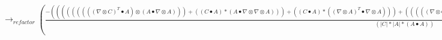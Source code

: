 \documentclass{article}
\begin{document}
\newline $\rightarrow_{refactor}( \frac{-{((((((((( \nabla  \otimes C)^T \bullet A) \otimes (A \bullet  \nabla  \otimes A)))+((C \bullet A)*(A \bullet  \nabla  \otimes  \nabla  \otimes A)))+((C \bullet A)*(( \nabla  \otimes A)^T \bullet  \nabla  \otimes A)))+((((( \nabla  \otimes C)^T \bullet A)*(A \bullet  \nabla  \otimes A))))^T)+((((C \bullet  \nabla  \otimes A)*(A \bullet  \nabla  \otimes A))))^T)+(((C \bullet  \nabla  \otimes A) \otimes (A \bullet  \nabla  \otimes A))))}}{(|C|*|A|*(A \bullet A))}+ \frac{((C \bullet A)*((C \bullet  \nabla  \otimes C) \otimes (C \bullet  \nabla  \otimes C)))}{(|C|*|A|*((C \bullet C))^2)}+ \frac{((((Trav( \nabla  \otimes  \nabla  \otimes C)<2,0,1> \bullet A)+(( \nabla  \otimes C)^T \bullet  \nabla  \otimes A))+(Trav( \nabla  \otimes  \nabla  \otimes A)<2,0,1> \bullet C))+(( \nabla  \otimes A)^T \bullet  \nabla  \otimes C))}{(|C|*|A|)}+ \frac{-{((|C|*(C \bullet A)*(( \nabla  \otimes C)^T \bullet  \nabla  \otimes C))+(|C|*(C \bullet A)*(C \bullet  \nabla  \otimes  \nabla  \otimes C)))}}{(|A|*(C \bullet C)*(C \bullet C))}+ \frac{-{((((( \nabla  \otimes A)^T \bullet C) \otimes (C \bullet  \nabla  \otimes C)))+((((C \bullet  \nabla  \otimes A)*(C \bullet  \nabla  \otimes C))))^T+(((( \nabla  \otimes C)^T \bullet A) \otimes (C \bullet  \nabla  \otimes C)))+((((( \nabla  \otimes C)^T \bullet A)*(C \bullet  \nabla  \otimes C))))^T)}}{(|A|*|C|*(C \bullet C))}+ \frac{(2*|C|*(C \bullet A)*((C \bullet  \nabla  \otimes C) \otimes (C \bullet  \nabla  \otimes C)))}{(|A|*(C \bullet C)*((C \bullet C))^2)}+ \frac{(((C \bullet A)*((A \bullet  \nabla  \otimes A) \otimes (C \bullet  \nabla  \otimes C)))+(((C \bullet A)*((A \bullet  \nabla  \otimes A)*(C \bullet  \nabla  \otimes C))))^T)}{((C \bullet C)*|A|*|C|*(A \bullet A))}+ \frac{(((C \bullet A)*((A \bullet  \nabla  \otimes A) \otimes (A \bullet  \nabla  \otimes A)))+(2*(C \bullet A)*((A \bullet  \nabla  \otimes A) \otimes (A \bullet  \nabla  \otimes A))))}{(|A|*|C|*((A \bullet A))^2)})$\\
\end{document}
